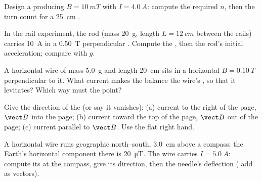 \begin{exercise}[$\star\star$]\label{exo:g11:magnetic-fields:8}
Design a  producing $B = \qty{10}{mT}$ with $I = \qty{4.0}{A}$:
compute the required $n$, then the turn count for a \qty{25}{cm} .
\end{exercise}

\begin{exercise}[$\star\star$]\label{exo:g11:magnetic-fields:9}
In the rail experiment, the rod (mass \qty{20}{g}, length
$L = \qty{12}{cm}$ between the rails) carries \qty{10}{A} in a
\qty{0.50}{T} perpendicular . Compute the , then the
rod's initial acceleration; compare with $g$.
\end{exercise}

\begin{exercise}[$\star\star$]\label{exo:g11:magnetic-fields:10}
A horizontal wire of mass \qty{5.0}{g} and length \qty{20}{cm} sits in
a horizontal  $B = \qty{0.10}{T}$ perpendicular to it. What
current makes the  balance the wire's , so that it
levitates? Which way must the  point?
\end{exercise}

\begin{exercise}[$\star\star$]\label{exo:g11:magnetic-fields:11}
Give the direction of the  (or say it vanishes):
(a) current to the right of the page, $\vect B$ into the page;
(b) current toward the top of the page, $\vect B$ out of the page;
(c) current parallel to $\vect B$. Use the flat right hand.
\end{exercise}

\begin{exercise}[$\star\star\star$]\label{exo:g11:magnetic-fields:12}
A horizontal wire runs geographic north--south, \qty{3.0}{cm} above a
compass; the Earth's horizontal component there is \qty{20}{\micro T}.
The wire carries $I = \qty{5.0}{A}$: compute its  at the compass,
give its direction, then the needle's deflection ( add as vectors).
\end{exercise}

